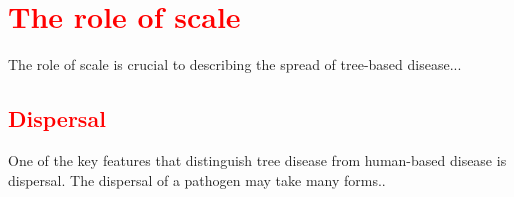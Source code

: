 \section{\textcolor{red}{The role of scale}}
The role of scale is crucial to describing the spread of tree-based disease...
\blindtext

\subsection{\textcolor{red}{Dispersal}}
One of the key features that distinguish tree disease from human-based disease is dispersal. The dispersal of a pathogen may take many forms..
\blindtext

